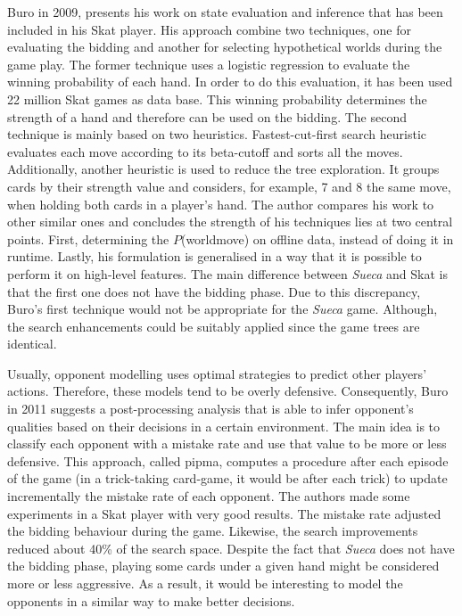 Buro in 2009, presents his work on state evaluation and inference that has been included in his Skat player.
His approach combine two techniques, one for evaluating the bidding and another for selecting hypothetical worlds during the game play.
The former technique uses a logistic regression to evaluate the winning probability of each hand.
In order to do this evaluation, it has been used 22 million Skat games as data base.
This winning probability determines the strength of a hand and therefore can be used on the bidding.
The second technique is mainly based on two heuristics.
Fastest-cut-first search heuristic evaluates each move according to its beta-cutoff and sorts all the moves.
Additionally, another heuristic is used to reduce the tree exploration.
It groups cards by their strength value and considers, for example, 7 and 8 the same move, when holding both cards in a player's hand.
The author compares his work to other similar ones and concludes the strength of his techniques lies at two central points.
First, determining the $P$(world\textbar move) on offline data, instead of doing it in runtime.
Lastly, his formulation is generalised in a way that it is possible to perform it on high-level features.
The main difference between \emph{Sueca} and Skat is that the first one does not have the bidding phase.
Due to this discrepancy, Buro's first technique would not be appropriate for the \emph{Sueca} game.
Although, the search enhancements could be suitably applied since the game trees are identical.


Usually, opponent modelling uses optimal strategies to predict other players' actions.
Therefore, these models tend to be overly defensive.
Consequently, Buro in 2011 suggests a post-processing analysis that is able to infer opponent's qualities based on their decisions in a certain environment.
The main idea is to classify each opponent with a mistake rate and use that value to be more or less defensive.
This approach, called \gls{pipma}, computes a procedure after each episode of the game (in a trick-taking card-game, it would be after each trick) to update incrementally the mistake rate of each opponent.
The authors made some experiments in a Skat player with very good results.
The mistake rate adjusted the bidding behaviour during the game.
Likewise, the search improvements reduced about 40\% of the search space.
Despite the fact that \emph{Sueca} does not have the bidding phase, playing some cards under a given hand might be considered more or less aggressive.
As a result, it would be interesting to model the opponents in a similar way to make better decisions.

